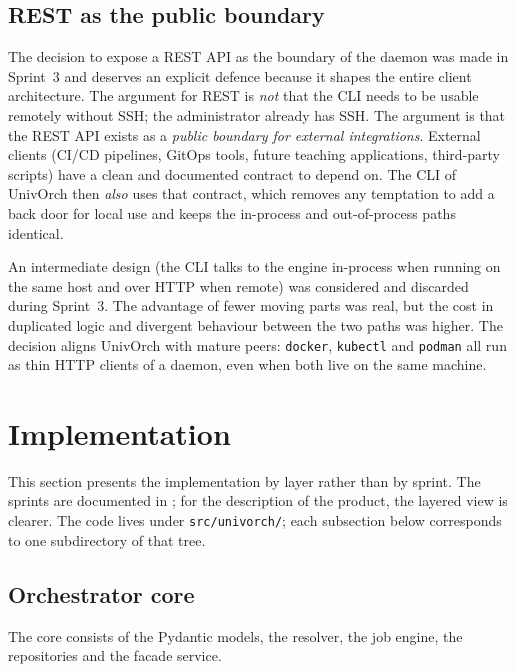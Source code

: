 \subsection{REST as the public boundary}
\label{subsec:rest-boundary}

The decision to expose a REST API as the boundary of the daemon was
made in Sprint~3 and deserves an explicit defence because it shapes
the entire client architecture. The argument for REST is \emph{not}
that the CLI needs to be usable remotely without SSH; the
administrator already has SSH. The argument is that the REST API
exists as a \emph{public boundary for external integrations}.
External clients (CI/CD pipelines, GitOps tools, future teaching
applications, third-party scripts) have a clean and documented
contract to depend on. The CLI of UnivOrch then \emph{also} uses
that contract, which removes any temptation to add a back door for
local use and keeps the in-process and out-of-process paths
identical.

An intermediate design (the CLI talks to the engine in-process when
running on the same host and over HTTP when remote) was considered
and discarded during Sprint~3. The advantage of fewer moving parts
was real, but the cost in duplicated logic and divergent behaviour
between the two paths was higher. The decision aligns UnivOrch with
mature peers: \texttt{docker}, \texttt{kubectl} and \texttt{podman}
all run as thin HTTP clients of a daemon, even when both live on
the same machine.

\section{Implementation}
\label{sec:implementacion}

This section presents the implementation by layer rather than by
sprint. The sprints are documented in ; for the
description of the product, the layered view is clearer. The code
lives under \texttt{src/univorch/}; each subsection below
corresponds to one subdirectory of that tree.

\subsection{Orchestrator core}

The core consists of the Pydantic models, the resolver, the job
engine, the repositories and the facade service.

